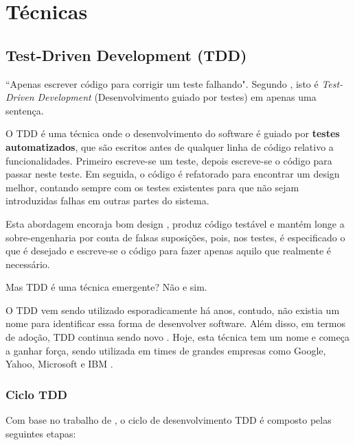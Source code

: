 \chapter{Técnicas}

\section{Test-Driven Development (TDD)}
\label{sub:tdd}
``Apenas escrever código para corrigir um teste falhando". Segundo , isto é \textit{Test-Driven Development} (Desenvolvimento guiado por testes) \cite{TDDbyExample} em apenas uma sentença.

O TDD é uma técnica onde o desenvolvimento do software é guiado por \textbf{testes automatizados}, que são escritos antes de qualquer linha de código relativo a funcionalidades. Primeiro escreve-se um teste, depois escreve-se o código para passar neste teste. Em seguida, o código é refatorado para encontrar um design melhor, contando sempre com os testes existentes para que não sejam introduzidas falhas em outras partes do sistema.

Esta abordagem encoraja bom design \cite{GrowingOOByTests}, produz código testável e mantém longe a sobre-engenharia por conta de falsas suposições, pois, nos testes, é especificado o que é desejado e escreve-se o código para fazer apenas aquilo que realmente é necessário. \cite{TestDrivenKoskela, TDDbyExample, EmpiricalTDD}

Mas TDD é uma técnica emergente? Não e sim.

O TDD vem sendo utilizado esporadicamente há anos, contudo, não existia um nome para identificar essa forma de desenvolver software. Além disso, em termos de adoção, TDD continua sendo novo \cite{TestDrivenKoskela, TDDbyExample, EmpiricalTDD}. Hoje, esta técnica tem um nome e começa a ganhar força, sendo utilizada em times de grandes empresas como Google, Yahoo, Microsoft e IBM \cite{EmpiricalTDD}.

\subsection{Ciclo TDD}
\label{ssub:ciclo_tdd}

Com base no trabalho de , o ciclo de desenvolvimento TDD é composto pelas seguintes etapas:


